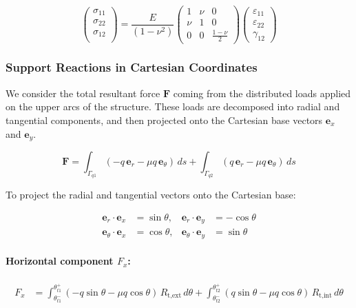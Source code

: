 \documentclass[12pt]{article}
\begin{document}
\begin{equation}
    \begin{pmatrix}
    \sigma_{11} \\
    \sigma_{22} \\
    \sigma_{12} \\
    \end{pmatrix}= \frac{E}{(1-\nu^2)}\begin{pmatrix}
    1 &  \nu & 0  \\
    \nu & 1 & 0 \\
    0 & 0 & \frac{1-\nu}{2} 
    \end{pmatrix}
    \begin{pmatrix}
    \varepsilon_{11} \\
    \varepsilon_{22} \\
    \gamma_{12}
    \end{pmatrix}
\end{equation}


\subsubsection{Support Reactions in Cartesian Coordinates}

We consider the total resultant force $\mathbf{F}$ coming from the distributed loads applied on the upper arcs of the structure. These loads are decomposed into radial and tangential components, and then projected onto the Cartesian base vectors $\mathbf{e}_x$ and $\mathbf{e}_y$.

\begin{equation}
\boxed{
\mathbf{F} =
\int_{\Gamma_{q1}} (-q\, \mathbf{e}_r - \mu q\, \mathbf{e}_\theta) \, ds
+
\int_{\Gamma_{q2}} (q\, \mathbf{e}_r - \mu q\, \mathbf{e}_\theta) \, ds
}
\end{equation}

To project the radial and tangential vectors onto the Cartesian base:

\begin{align*}
\mathbf{e}_r \cdot \mathbf{e}_x &= \sin\theta, &
\mathbf{e}_r \cdot \mathbf{e}_y &= -\cos\theta \\
\mathbf{e}_\theta \cdot \mathbf{e}_x &= \cos\theta, &
\mathbf{e}_\theta \cdot \mathbf{e}_y &= \sin\theta
\end{align*}

\paragraph{Horizontal component \( F_x \):}
\begin{align}
F_x &=
\int_{\theta_{t1}^-}^{\theta_{t1}^+} (-q \sin\theta - \mu q \cos\theta) \, R_{\text{t,ext}} \, d\theta
+
\int_{\theta_{t2}^-}^{\theta_{t2}^+} (q \sin\theta - \mu q \cos\theta) \, R_{\text{t,int}} \, d\theta
\tag{2.25}
\end{align}
\end{document}
